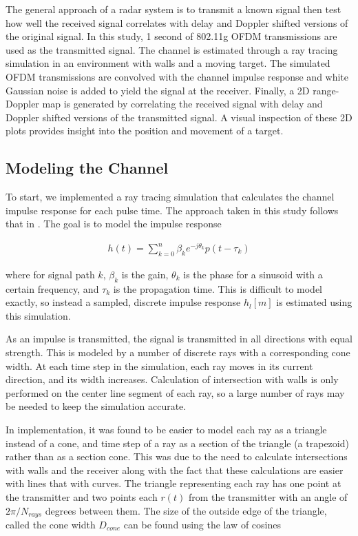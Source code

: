\documentclass[article,11pt,onecolumn,final]{IEEEtran}
\begin{document}
The general approach of a radar system is to transmit a known signal then test how well the received signal correlates with delay and Doppler shifted versions of the original signal. In this study, 1 second of 802.11g OFDM transmissions are used as the transmitted signal. The channel is estimated through a ray tracing simulation in an environment with walls and a moving target. The simulated OFDM transmissions are convolved with the channel impulse response and white Gaussian noise is added to yield the signal at the receiver. Finally, a 2D range-Doppler map is generated by correlating the received signal with delay and Doppler shifted versions of the transmitted signal. A visual inspection of these 2D plots provides insight into the position and movement of a target.

\subsection{Modeling the Channel}

To start, we implemented a ray tracing simulation that calculates the channel impulse response for each pulse time. The approach taken in this study follows that in \cite{Holt}. The goal is to model the impulse response

\begin{align*}
 h(t) = \sum_{k=0}^{n} \beta_k e^{-j \theta_k} p(t - \tau_k) 
\end{align*}

where for signal path $k$, $\beta_k$ is the gain, $\theta_k$ is the phase for a sinusoid with a certain frequency, and $\tau_k$ is the propagation time. This is difficult to model exactly, so instead a sampled, discrete impulse response $h_l[m]$ is estimated using this simulation. 

As an impulse is transmitted, the signal is transmitted in all directions with equal strength. This is modeled by a number of discrete rays with a corresponding cone width. At each time step in the simulation, each ray moves in its current direction, and its width increases. Calculation of intersection with walls is only performed on the center line segment of each ray, so a large number of rays may be needed to keep the simulation accurate. 

In implementation, it was found to be easier to model each ray as a triangle instead of a cone, and time step of a ray as a section of the triangle (a trapezoid) rather than as a section cone. This was due to the need to calculate intersections with walls and the receiver along with the fact that these calculations are easier with lines that with curves. The triangle representing each ray has one point at the transmitter and two points each $r(t)$ from the transmitter with an angle of $2 \pi/N_{rays}$ degrees between them. The size of the outside edge of the triangle, called the cone width $D_{cone}$ can be found using the law of cosines
\end{document}
